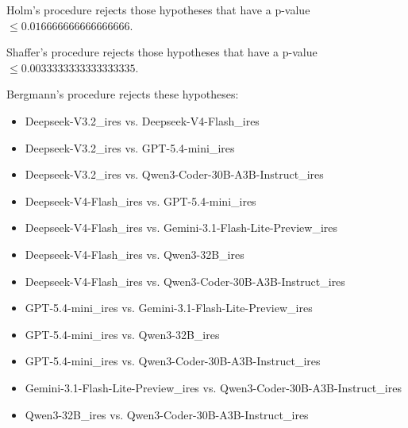 \documentclass[a4paper,10pt]{article}
\begin{document}
\begin{landscape}
Holm's procedure rejects those hypotheses that have a p-value $\le0.016666666666666666$.


Shaffer's procedure rejects those hypotheses that have a p-value $\le0.0033333333333333335$.


Bergmann's procedure rejects these hypotheses:


\begin{itemize}


\item Deepseek-V3.2_ires vs. Deepseek-V4-Flash_ires\item Deepseek-V3.2_ires vs. GPT-5.4-mini_ires\item Deepseek-V3.2_ires vs. Qwen3-Coder-30B-A3B-Instruct_ires\item Deepseek-V4-Flash_ires vs. GPT-5.4-mini_ires\item Deepseek-V4-Flash_ires vs. Gemini-3.1-Flash-Lite-Preview_ires\item Deepseek-V4-Flash_ires vs. Qwen3-32B_ires\item Deepseek-V4-Flash_ires vs. Qwen3-Coder-30B-A3B-Instruct_ires\item GPT-5.4-mini_ires vs. Gemini-3.1-Flash-Lite-Preview_ires\item GPT-5.4-mini_ires vs. Qwen3-32B_ires\item GPT-5.4-mini_ires vs. Qwen3-Coder-30B-A3B-Instruct_ires\item Gemini-3.1-Flash-Lite-Preview_ires vs. Qwen3-Coder-30B-A3B-Instruct_ires\item Qwen3-32B_ires vs. Qwen3-Coder-30B-A3B-Instruct_ires\end{itemize}



\end{landscape}
\end{document}
